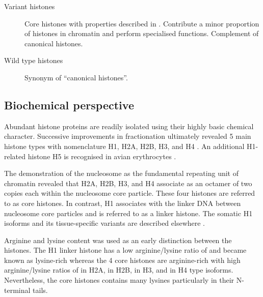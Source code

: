 {\begin{shaded}
\begin{description}
        \item[Variant histones] \hfill \newline
        Core histones with properties described in .
        Contribute a minor proportion of histones in chromatin and perform specialised functions.
        Complement of canonical histones.

        \item[Wild type histones] \hfill \newline
        Synonym of ``canonical histones''.
      \end{description}
    \end{shaded}
  }

  \subsection{Biochemical perspective}

    Abundant histone proteins are readily isolated using their
    highly basic chemical character.
    Successive improvements in fractionation ultimately revealed 5 main histone types
    with nomenclature H1, H2A, H2B, H3, and H4 \citep{nomenclature}.
    An additional H1-related histone H5 is recognised in avian erythrocytes \citep{HFive-review}.

    The demonstration of the nucleosome as the fundamental
    repeating unit of chromatin \citep{Kornberg1974}
    revealed that H2A, H2B, H3, and H4 associate as an octamer of two copies each within the
    nucleosome core particle. These four histones are referred to as core histones.
    In contrast, H1 associates with the linker DNA between nucleosome core particles
    and is referred to as a linker histone.
    The somatic H1 isoforms and its tissue-specific
    variants are described elsewhere \citep{HarshmanFreitas2013}.

    Arginine and lysine content was used as an early distinction between the histones.
    The H1 linker histone has a low arginine/lysine ratio of
     \result{}
    and became known as lysine-rich
    whereas the 4 core histones are arginine-rich
    with high arginine/lysine ratios of
     \result{} in H2A,
     \result{} in H2B,
     \result{} in H3,
    and  \result{} in H4 type isoforms.
    Nevertheless, the core histones contains many lysines particularly in their N-terminal tails.

